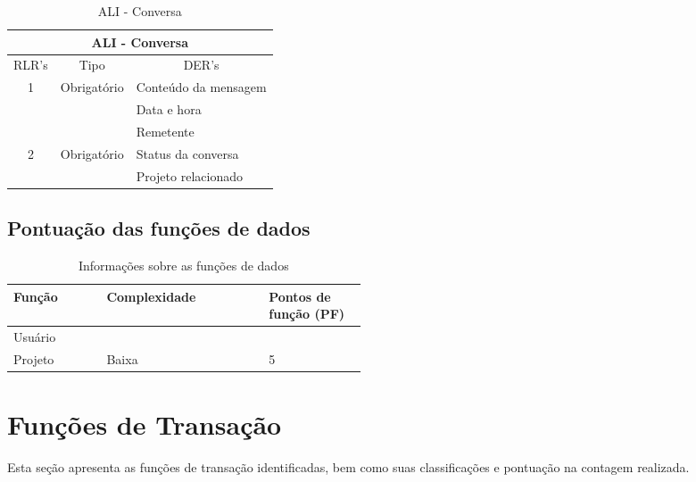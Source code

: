       \begin{table}[!h]
      \centering
      \caption{ALI - Conversa}
      \label{my-label}
      \begin{tabular}{|c|c|l|}
      \hline
      \multicolumn{3}{|c|}{ALI - Conversa}                                                    \\ \hline
      \multicolumn{1}{|l|}{RLR's} & Tipo                         & \multicolumn{1}{c|}{DER's} \\ \hline
      \multirow{3}{*}{1}          & \multirow{3}{*}{Obrigatório} & Conteúdo da mensagem       \\ \cline{3-3} 
				  &                              & Data e hora                \\ \cline{3-3} 
				  &                              & Remetente                  \\ \hline
      \multirow{2}{*}{2}          & \multirow{2}{*}{Obrigatório} & Status da conversa         \\ \cline{3-3} 
				  &                              & Projeto relacionado        \\ \hline
      \end{tabular}
      \end{table}
      
  \subsection{Pontuação das funções de dados}
  
      \begin{table*}[!h]
      \centering
      \caption{Informações sobre as funções de dados}
      \label{funcoes_dados}
	\begin{tabular}{|p{0.12\linewidth}|p{0.20\linewidth}|p{0.14\linewidth}|}
	\hline
	\textbf{Função} & \textbf{Complexidade} & \textbf{Pontos de função (PF)} \\
	  \hline
	Usuário &   & \\
	\hline
	Projeto & Baixa & 5 \\
	\hline
	\end{tabular}
      \end{table*}
\vfill
\pagebreak
\section{Funções de Transação}
  
 Esta seção apresenta as funções de transação identificadas, bem como suas classificações e pontuação na contagem realizada.
  
